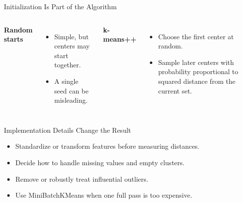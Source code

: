 \begin{frame}{Initialization Is Part of the Algorithm}
  \begin{columns}[T,onlytextwidth]
      \textbf{Random starts}
      \begin{itemize}\spaceditems
        \item Simple, but centers may start together.
        \item A single seed can be misleading.
      \end{itemize}
      \textbf{k-means++}
      \begin{itemize}\spaceditems
        \item Choose the first center at random.
        \item Sample later centers with probability proportional to squared distance from the current set.
      \end{itemize}
  \end{columns}
  \pause
  \vspace{.5cm}
\end{frame}

\begin{frame}{Implementation Details Change the Result}

      \begin{itemize}\spaceditems
        \item Standardize or transform features before measuring distances.
        \item Decide how to handle missing values and empty clusters.
        \item Remove or robustly treat influential outliers.
           \item Use MiniBatchKMeans when one full pass is too expensive.
      \end{itemize}

\end{frame}

